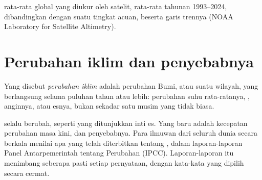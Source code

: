 \begin{omfigure}

{\small {} rata-rata global yang diukur oleh satelit, rata-rata
tahunan 1993--2024, dibandingkan dengan suatu tingkat acuan, beserta garis
trennya (NOAA Laboratory for Satellite Altimetry).}
\label{fig:g9:climate-past-and-present:sea}
\end{omfigure}

\section{Perubahan iklim dan penyebabnya}

\begin{definition}\label{def:g9:climate-past-and-present:climate-change}
Yang disebut \emph{perubahan iklim} adalah
perubahan  Bumi, atau  suatu wilayah, yang berlangsung selama
puluhan tahun atau lebih: perubahan suhu rata-ratanya, ,
anginnya, atau esnya, bukan sekadar satu musim yang tidak biasa.
\end{definition}

 selalu berubah, seperti yang ditunjukkan inti es. Yang baru adalah
kecepatan perubahan masa kini, dan penyebabnya. Para ilmuwan dari seluruh
dunia secara berkala menilai apa yang telah diterbitkan tentang ,
dalam laporan-laporan Panel Antarpemerintah tentang Perubahan 
(IPCC). Laporan-laporan itu menimbang seberapa pasti setiap pernyataan,
dengan kata-kata yang dipilih secara cermat.

